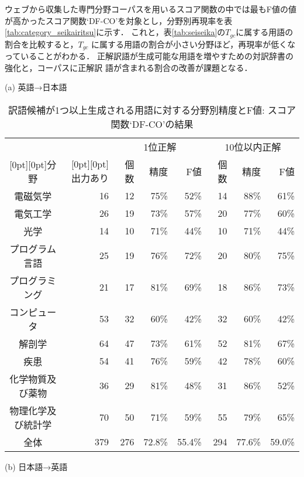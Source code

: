 \documentclass[japanese]{jnlp_1.3a}
\begin{document}
ウェブから収集した専門分野コーパスを用いるスコア関数の中では最もF値の値
が高かったスコア関数`DF-CO'を対象とし，分野別再現率を表
\ref{tab:category_seikairitsu}に示す．
これと，表\ref{tab:seiseika}の$T_{gc}$に属する用語の割合を比較すると，$T_{gc}$ 
に属する用語の割合が小さい分野ほど，再現率が低くなっていることがわかる．
正解訳語が生成可能な用語を増やすための対訳辞書の強化と，コーパスに正解訳
語が含まれる割合の改善が課題となる．

\begin{table}[t]
 \small
 \centering
 \caption{訳語候補が1つ以上生成される用語に対する分野別精度とF値: スコア関数`DF-CO'の結果}
 \label{tab:category_seido}
 (a) 英語→日本語
\vspace{4pt}

 \begin{tabular}{|c|r|r|r|r|r|r|r|}
  \hline
  & & \multicolumn{3}{|c|}{1位正解} & \multicolumn{3}{|c|}{10位以内正解} \\
      \cline{3-8}
    \raisebox{0.5\normalbaselineskip}[0pt][0pt]{分野} & \raisebox{0.5\normalbaselineskip}[0pt][0pt]{出力あり} 
	& 個数 & 精度 & F値 & 個数 & 精度 & F値\\
  \hline \hline
  電磁気学           & 16 & 12 & 75\% & 52\% & 14 & 88\% & 61\% \\
  電気工学           & 26 & 19 & 73\% & 57\% & 20 & 77\% & 60\% \\
  光学               & 14 & 10 & 71\% & 44\% & 10 & 71\% & 44\% \\
  プログラム言語     & 25 & 19 & 76\% & 72\% & 20 & 80\% & 75\% \\
  プログラミング     & 21 & 17 & 81\% & 69\% & 18 & 86\% & 73\% \\
  コンピュータ       & 53 & 32 & 60\% & 42\% & 32 & 60\% & 42\% \\
  解剖学             & 64 & 47 & 73\% & 61\% & 52 & 81\% & 67\% \\
  疾患               & 54 & 41 & 76\% & 59\% & 42 & 78\% & 60\% \\
  化学物質及び薬物   & 36 & 29 & 81\% & 48\% & 31 & 86\% & 52\% \\
  物理化学及び統計学 & 70 & 50 & 71\% & 59\% & 55 & 79\% & 65\% \\
  \hline	         	         
  全体               & 379 & 276 & 72.8\% & 55.4\% & 294 & 77.6\% & 59.0\% \\
  \hline
 \end{tabular}

     \vspace{\baselineskip}
 (b) 日本語→英語
\vspace{4pt}


\end{table}
\end{document}

